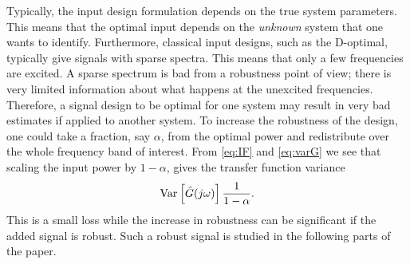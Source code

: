 Typically, the input design formulation depends on the true system parameters. This means that the optimal input depends on the \emph{unknown} system that one wants to identify. Furthermore, classical input designs, such as the D-optimal, typically give signals with sparse spectra. This means that only a few frequencies are excited. A sparse spectrum is bad from a robustness point of view; there is very limited information about what happens at the unexcited frequencies. Therefore, a signal design to be optimal for one system may result in very bad estimates if applied to another system. To increase the robustness of the design, one could take a fraction, say $\alpha$, from the optimal power and redistribute over the whole frequency band of interest. From \eqref{eq:IF} and \eqref{eq:varG} we see that scaling the input power by $1-\alpha$, gives the transfer function variance
\begin{align}
\operatorname{\mathrm{Var}}_{} \left[ \hat{G}(j\omega) \right]\frac{1}{1-\alpha}.
\end{align}
This is a small loss while the increase in robustness can be significant if the added signal is robust. Such a robust signal is studied in the following parts of the paper.


